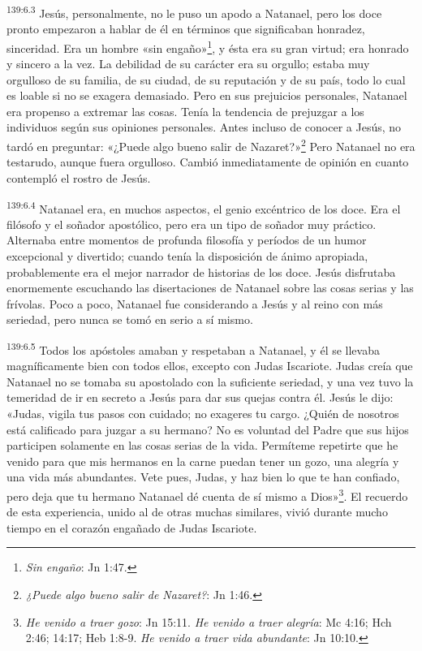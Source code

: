 \par
\textsuperscript{139:6.3} Jesús, personalmente, no le puso un apodo a Natanael, pero los doce pronto empezaron a hablar de él en términos que significaban honradez, sinceridad. Era un hombre «sin engaño»\footnote{\textit{Sin engaño}: Jn 1:47.}, y ésta era su gran virtud; era honrado y sincero a la vez. La debilidad de su carácter era su orgullo; estaba muy orgulloso de su familia, de su ciudad, de su reputación y de su país, todo lo cual es loable si no se exagera demasiado. Pero en sus prejuicios personales, Natanael era propenso a extremar las cosas. Tenía la tendencia de prejuzgar a los individuos según sus opiniones personales. Antes incluso de conocer a Jesús, no tardó en preguntar: «¿Puede algo bueno salir de Nazaret?»\footnote{\textit{¿Puede algo bueno salir de Nazaret?}: Jn 1:46.} Pero Natanael no era testarudo, aunque fuera orgulloso. Cambió inmediatamente de opinión en cuanto contempló el rostro de Jesús.

\par
\textsuperscript{139:6.4} Natanael era, en muchos aspectos, el genio excéntrico de los doce. Era el filósofo y el soñador apostólico, pero era un tipo de soñador muy práctico. Alternaba entre momentos de profunda filosofía y períodos de un humor excepcional y divertido; cuando tenía la disposición de ánimo apropiada, probablemente era el mejor narrador de historias de los doce. Jesús disfrutaba enormemente escuchando las disertaciones de Natanael sobre las cosas serias y las frívolas. Poco a poco, Natanael fue considerando a Jesús y al reino con más seriedad, pero nunca se tomó en serio a sí mismo.

\par
\textsuperscript{139:6.5} Todos los apóstoles amaban y respetaban a Natanael, y él se llevaba magníficamente bien con todos ellos, excepto con Judas Iscariote. Judas creía que Natanael no se tomaba su apostolado con la suficiente seriedad, y una vez tuvo la temeridad de ir en secreto a Jesús para dar sus quejas contra él. Jesús le dijo: «Judas, vigila tus pasos con cuidado; no exageres tu cargo. ¿Quién de nosotros está calificado para juzgar a su hermano? No es voluntad del Padre que sus hijos participen solamente en las cosas serias de la vida. Permíteme repetirte que he venido para que mis hermanos en la carne puedan tener un gozo, una alegría y una vida más abundantes. Vete pues, Judas, y haz bien lo que te han confiado, pero deja que tu hermano Natanael dé cuenta de sí mismo a Dios»\footnote{\textit{He venido a traer gozo}: Jn 15:11. \textit{He venido a traer alegría}: Mc 4:16; Hch 2:46; 14:17; Heb 1:8-9. \textit{He venido a traer vida abundante}: Jn 10:10.}. El recuerdo de esta experiencia, unido al de otras muchas similares, vivió durante mucho tiempo en el corazón engañado de Judas Iscariote.

